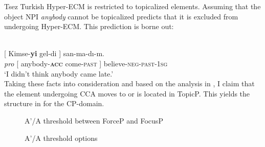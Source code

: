 \documentclass[output=paper,colorlinks,citecolor=brown]{langscibook}
\begin{document}
\ea\label{lohningertsez}
{Tsez} \citep[610]{polinsky2001long}
\z 
\z 
Turkish Hyper-ECM is restricted to topicalized elements. Assuming that the object NPI \emph{anybody} cannot be topicalized predicts that it is excluded from undergoing Hyper-ECM. This prediction is borne out:

 \citep[14]{csener2008non}\\
\gll * {} {[} Kimse-\textbf{yi} gel-di {]} san-ma-d{\i}-m.\\
{} \emph{pro} [ anybody-\textbf{\textsc{acc}} come-\textsc{past} ] believe-\textsc{neg-past-1sg}\\
\glt \phantom{*} ‘I didn’t think anybody came late.'\\
\z
Taking these facts into consideration and based on the analysis in \citet{csener2008non}, I claim that the element undergoing CCA moves to or is located in TopicP. This yields the structure in  for the CP-domain.

\begin{figure}\RawFloats\CenterFloatBoxes
\begin{floatrow}
\captionsetup{margin=.05\linewidth}
{\caption{A'/A threshold between ForceP and FocusP}\label{fig:lohninger:tree2}} 

{\caption{A'/A threshold options\label{lohningertab:3}}}
\end{floatrow}
\end{figure}
\end{document}
